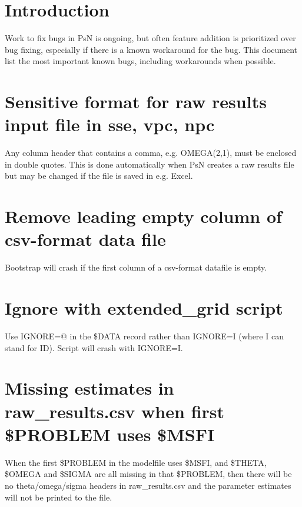 



\maketitle


\section{Introduction}
Work to fix bugs in PsN is ongoing, but often feature addition is prioritized over bug fixing, especially if there is a known workaround for the bug. This document list the most important known bugs, including workarounds when possible.   

\section{Sensitive format for raw results input file in sse, vpc, npc}

Any column header that contains a comma, e.g. OMEGA(2,1), must be enclosed in double quotes. This is done automatically when PsN creates a raw results file but may be changed if the file is saved in e.g. Excel.

\section{Remove leading empty column of csv-format data file}

Bootstrap will crash if the first column of a csv-format datafile is empty.

\section{Ignore with extended\_grid script}
Use IGNORE=@ in the \$DATA record rather than IGNORE=I (where I can stand for ID). Script will crash with IGNORE=I.

\section{Missing estimates in raw\_results.csv when first \$PROBLEM uses \$MSFI}
When the first \$PROBLEM in the modelfile uses \$MSFI, and \$THETA, \$OMEGA and \$SIGMA are all missing in that \$PROBLEM, then there will be no theta/omega/sigma headers in raw\_results.csv and the parameter estimates will not be printed to the file.

